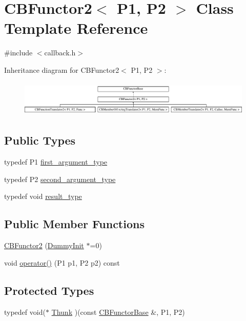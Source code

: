 \hypertarget{class_c_b_functor2}{\section{C\+B\+Functor2$<$ P1, P2 $>$ Class Template Reference}
\label{class_c_b_functor2}
}


{\ttfamily \#include $<$callback.\+h$>$}

Inheritance diagram for C\+B\+Functor2$<$ P1, P2 $>$\+:\begin{figure}[H]
\begin{center}
\leavevmode
\includegraphics[height=1.717791cm]{class_c_b_functor2}
\end{center}
\end{figure}
\subsection*{Public Types}
\begin{DoxyCompactItemize}
\item 
typedef P1 \hyperlink{class_c_b_functor2_a0b602135cc723557db0a98baac332f64}{first\+\_\+argument\+\_\+type}
\item 
typedef P2 \hyperlink{class_c_b_functor2_a42cb017aa79a85ae6c4c0d908b40b6e4}{second\+\_\+argument\+\_\+type}
\item 
typedef void \hyperlink{class_c_b_functor2_a7043f721c3f7cc64589a88ba678ade59}{result\+\_\+type}
\end{DoxyCompactItemize}
\subsection*{Public Member Functions}
\begin{DoxyCompactItemize}
\item 
\hyperlink{class_c_b_functor2_a13d4578fd890d0074cb22e711c25005d}{C\+B\+Functor2} (\hyperlink{class_c_b_functor_base_1_1_dummy_init}{Dummy\+Init} $\ast$=0)
\item 
void \hyperlink{class_c_b_functor2_a8ef9e7a58474f11df3e9b0db59068016}{operator()} (P1 p1, P2 p2) const 
\end{DoxyCompactItemize}
\subsection*{Protected Types}
\begin{DoxyCompactItemize}
\item 
typedef void($\ast$ \hyperlink{class_c_b_functor2_ab4c4da92b06095c821a33b4d7ceab3e1}{Thunk} )(const \hyperlink{class_c_b_functor_base}{C\+B\+Functor\+Base} \&, P1, P2)
\end{DoxyCompactItemize}

